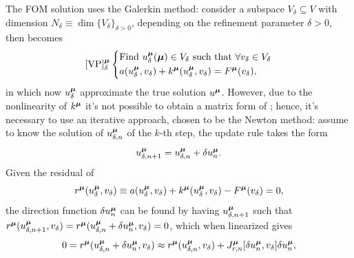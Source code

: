 \documentclass[
    conference,
    nofonttune,
    11pt
]{IEEEtran}
\begin{document}
            The FOM solution uses the Galerkin method: consider a subspace $V_\delta\subseteq V$ with dimension $N_\delta\equiv\dim\{V_\delta\}_{\delta>0}$, depending on the refinement parameter $\delta>0$, then  becomes
            \begin{equation}
                \refstepcounter{equation}
                \label{eqGalerVarNLEllipticPED}
                \text{\VarGalerNLEllPDE}
                \left\{\begin{aligned}
                    &\text{Find $u^\boldmu_\delta(\boldmu)\in V_\delta$
                    such that $\forall v_\delta\in V_\delta$}\\
                    &a(u^\boldmu_\delta,v_\delta)
                    +k^\boldmu(u^\boldmu_\delta,v_\delta)=
                    F^\boldmu(v_\delta),
                \end{aligned}\right.
                \notag
            \end{equation}
            in which now $u^{\boldsymbol\mu}_\delta$ approximate the true solution $u^{\boldsymbol\mu}$. However, due to the nonlinearity of $k^{\boldsymbol\mu}$ it's not possible to obtain a matrix form of ; hence, it's necessary to use an iterative approach, chosen to be the Newton method: assume to know the solution of $u^{\boldsymbol\mu}_{\delta,n}$ of the $k$-th step, the update rule takes the form
            \begin{equation}
                \label{eqUpdateRuleNewtonMethod}
                u^\boldmu_{\delta,n+1}
                =u^\boldmu_{\delta,n}
                +\delta u^\boldmu_n.
            \end{equation}
            Given the residual of 
            $$
                r^{\boldsymbol\mu}(u^{\boldsymbol\mu}_\delta,v_\delta)\equiv
                a(u^{\boldsymbol\mu}_\delta,v_\delta)
                +k^{\boldsymbol\mu}(u^{\boldsymbol\mu}_\delta,v_\delta)
                -F^{\boldsymbol\mu}(v_\delta)=0,
            $$
            the direction function $\delta u^{\boldsymbol\mu}_{n}$ can be found by having $u^{\boldsymbol\mu}_{\delta,n+1}$ such that $r^{\boldsymbol\mu}(u^{\boldsymbol\mu}_{\delta,n+1},v_{\delta})=r^{\boldsymbol\mu}(u^{\boldsymbol\mu}_{\delta,n}+\delta u^{\boldsymbol\mu}_n,v_{\delta})=0$, which when linearized gives
            $$
                0=r^{\boldsymbol\mu}(u^{\boldsymbol\mu}_{\delta,n}+\delta u^{\boldsymbol\mu}_n,v_\delta)
                \approx r^{\boldsymbol\mu}(u^{\boldsymbol\mu}_{\delta,n},v_\delta)
                +J^{\boldsymbol\mu}_{r,n}[\delta u^{\boldsymbol\mu}_n,v_\delta]\delta u^{\boldsymbol\mu}_n,
            $$
\end{document}
